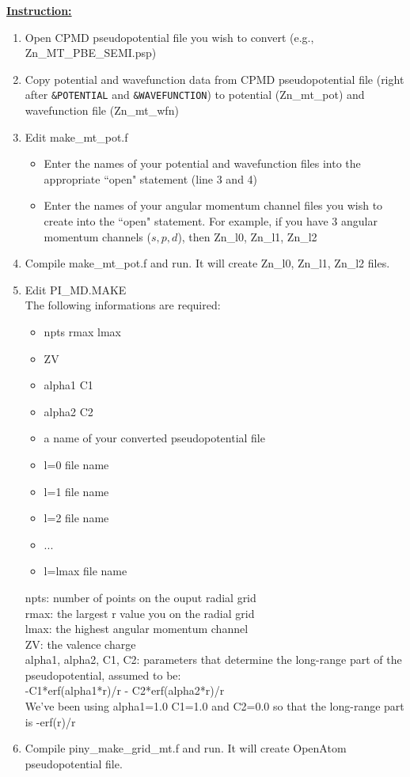 \vskip 12pt
\noindent
\underline{ {\bf Instruction:} }

\begin{enumerate}
\item Open CPMD pseudopotential file you wish to convert (e.g., Zn\_MT\_PBE\_SEMI.psp)
\item  Copy potential and wavefunction data from CPMD pseudopotential file (right after \verb+&POTENTIAL+ and \verb+&WAVEFUNCTION+) to potential (Zn{\_}mt{\_}pot) and wavefunction file (Zn\_mt\_wfn)
\item Edit make{\_}mt{\_}pot.f

        \begin{itemize}
	\item Enter the names of your potential and wavefunction files into the appropriate ``open" statement (line 3 and 4)
	\item Enter the names of your angular momentum channel files  you wish to create into the ``open" statement. 
	For example, if you have 3 angular momentum channels ($s, p, d$), then Zn{\_}l0, Zn{\_}l1, Zn{\_}l2
         \end{itemize}

\item Compile make{\_}mt{\_}pot.f and run. It will create Zn{\_}l0, Zn{\_}l1, Zn{\_}l2 files.

\item Edit PI{\_}MD.MAKE\\ The following informations are required:

	\begin{itemize}
	\item npts rmax lmax
	\item ZV
	\item alpha1 C1
	\item alpha2 C2
        \item a name of your converted pseudopotential file
	\item l=0 file name 
	\item l=1 file name 
	\item l=2 file name 
	\item...
	\item l=lmax file name
	\end{itemize}
	
	npts: number of points on the ouput radial grid\\
	rmax: the largest r value you on the radial grid\\
	lmax: the highest angular momentum channel\\
	ZV: the valence charge\\
	alpha1, alpha2, C1, C2: parameters that determine the long-range part of the pseudopotential, assumed to be:\\
	
	-C1*erf(alpha1*r)/r - C2*erf(alpha2*r)/r\\
	
	We've been using alpha1=1.0 C1=1.0 and C2=0.0 so that the long-range part is -erf(r)/r

\item Compile piny{\_}make{\_}grid{\_}mt.f and run. It will create OpenAtom pseudopotential file.
\end{enumerate}
